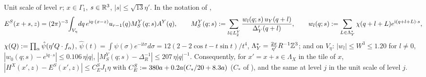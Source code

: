 \begin{lemma}\label{rot:hyb:lem:ADMS}
Unit scale of level $r$; $x\in\Gamma_1$, $s\in\mathbb R^3$, $|s|\le\sqrt{13}\eta'$. In the notation of ,
\[
E^S(x+s,z)=(2\pi)^{-3}\!\int_{V_\eta}\!dq\,e^{\mathrm iq\cdot(x-z)}u_{r-1}(q)M^Y_S(q;s)A^Y(q),\qquad M^Y_S(q;s):=\sum_{l\in L^Y_2}\frac{w_l(q;s)\,u_Y(q+l)}{\Delta'_Y(q+l)},\qquad
w_l(q;s):=\sum_{L\in\Lambda_Y^*}\chi(q+l+L)e^{\mathrm i(q+l+L)\cdot s},
\]
$\chi(Q):=\prod_\alpha\hat\psi(\eta'Q\cdot f_\alpha)$, $\hat\psi(t)=\int\psi(\sigma)e^{-\mathrm it\sigma}d\sigma=12(2-2\cos t-t\sin t)/t^4$, $\Lambda_Y^*=\frac{2\pi}{\eta'}R^{-1}\mathbb Z^3$; and on $V_\eta$: $|w_l|\le W^3\le1.20$ for $l\ne0$, $|w_0(q;s)-e^{\mathrm iq\cdot s}|\le0.106\,\eta|q|$, $|M^Y_S(q;s)-\Delta_R^{-1}|\le207\,\eta|q|^{-1}$. Consequently, for $x'=x+s\in\Lambda_X$ in the tile of $x$, $|H^X(x',z)-E^S(x',z)|\le C^S_EJ_1\eta$ with $C^S_E:=380a+0.2a(C_*/20+8.3a)$ ($C_*$ of ), and the same at level $j$ in the unit scale of level $j$.
\end{lemma}
